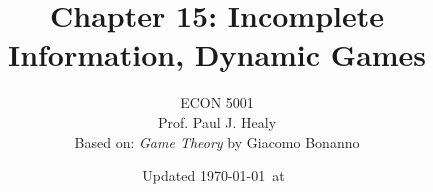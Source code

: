 

\title[Incomplete Information: Dynamic]{Chapter 15: Incomplete Information, Dynamic Games}
\author[ECON 5001]{ECON 5001\\Prof. Paul J. Healy\\Based on: \textit{Game Theory} by Giacomo Bonanno} \color{metrop}
\institute[OSU]{}
\date[]{\vfill {\tiny Updated \today\ at\ \DTMcurrenttime}}

%
